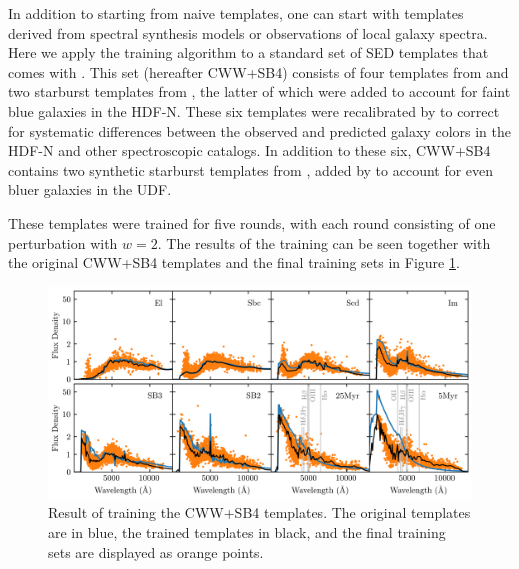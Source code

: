 In addition to starting from naive templates, one can start with templates derived from spectral synthesis models or observations of local galaxy spectra. 
Here we apply the training algorithm to a standard set of SED templates that comes with \bpz.
This set (hereafter CWW+SB4) consists of four templates from \citet{Coleman1980a} and two starburst templates from \citet{Kinney1996a}, the latter of which were added to account for faint blue galaxies in the HDF-N. 
These six templates were recalibrated by \citet{Benitez2004a} to correct for systematic differences between the observed and predicted galaxy colors in the HDF-N and other spectroscopic catalogs. 
In addition to these six, CWW+SB4 contains two synthetic starburst templates from \citet{Bruzual2003b}, added by \citet{Coe2006a} to account for even bluer galaxies in the UDF.

These templates were trained for five rounds, with each round consisting of one perturbation with $w=2$. 
The results of the training can be seen together with the original CWW+SB4 templates and the final training sets in Figure \ref{fig:cwwsb4_trained}. 

\begin{figure}
    \centering
    \includegraphics{figures/cwwsb4_trained.png}
    \caption{Result of training the CWW+SB4 templates. The original templates are in blue, the trained templates in black, and the final training sets are displayed as orange points.}
    \label{fig:cwwsb4_trained}
\end{figure}

